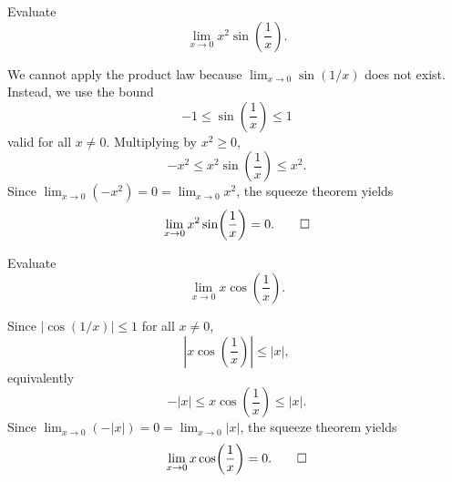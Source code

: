 \begin{workedexample}
\begin{example}
Evaluate
\[
\lim_{x \to 0} x^{2} \sin\!\left(\frac{1}{x}\right).
\]
\end{example}

\begin{solution}
We cannot apply the product law because \(\displaystyle \lim_{x \to 0} \sin(1/x)\) does not exist. Instead, we use the bound
\[
-1 \le \sin\!\left(\frac{1}{x}\right) \le 1
\]
valid for all \(x \neq 0\). Multiplying by \(x^{2} \ge 0\),
\[
-x^{2} \le x^{2} \sin\!\left(\frac{1}{x}\right) \le x^{2}.
\]
Since \(\displaystyle \lim_{x \to 0}(-x^{2}) = 0 = \lim_{x \to 0} x^{2}\), the squeeze theorem yields
\[
\lim_{x \to 0} x^{2} \sin\!\left(\frac{1}{x}\right) = 0. \qedhere
\]
\end{solution}
\end{workedexample}

\begin{workedexample}
\begin{example}
Evaluate
\[
\lim_{x \to 0} x \cos\!\left(\frac{1}{x}\right).
\]
\end{example}

\begin{solution}
Since \(\left|\cos(1/x)\right| \le 1\) for all \(x \neq 0\),
\[
\left|x \cos\!\left(\frac{1}{x}\right)\right| \le |x|,
\]
equivalently
\[
-|x| \le x \cos\!\left(\frac{1}{x}\right) \le |x|.
\]
Since \(\displaystyle \lim_{x \to 0}(-|x|) = 0 = \lim_{x \to 0} |x|\), the squeeze theorem yields
\[
\lim_{x \to 0} x \cos\!\left(\frac{1}{x}\right) = 0. \qedhere
\]
\end{solution}
\end{workedexample}

